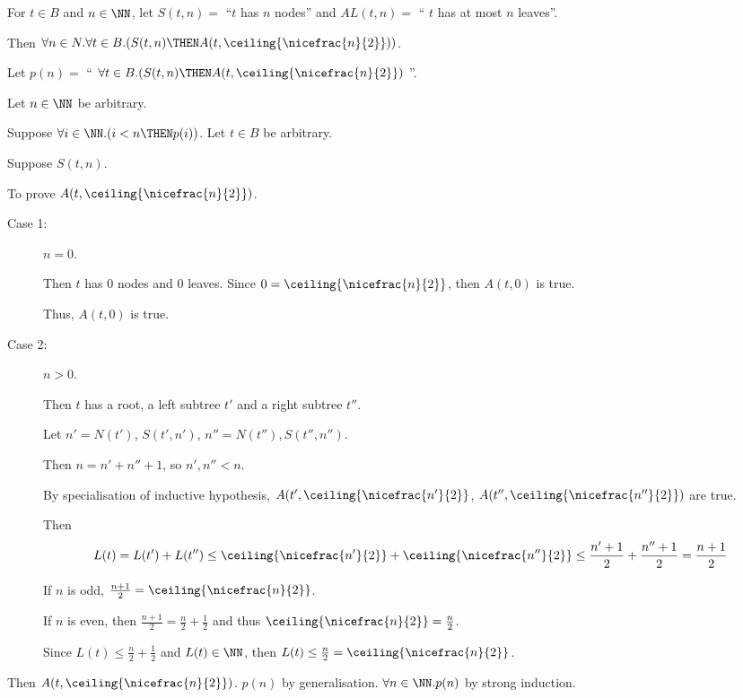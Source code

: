 \documentclass[11pt]{scrartcl}
\begin{document}
\begin{example}

  For $t\in B$ and $n\in \NN$, let $S(t,n) =$ ``$t$ has $n$ nodes'' and $AL(t, n)=$ `` $t$ has at most $n$ leaves''.

  Then $\forall n\in N.\forall t\in B.(S(t, n) \THEN A(t, \ceiling{\nicefrac{n}{2}}))$.

  Let $p(n) = $ `` $\forall t\in B.(S(t, n) \THEN A(t,\ceiling{\nicefrac{n}{2}})$ ''.

  Let $n\in\NN$ be arbitrary.

  Suppose $\forall i\in\NN.(i < n \THEN p(i))$.
  Let $t\in B$   be arbitrary.

  Suppose $S(t, n)$.

  To prove $A(t, \ceiling{\nicefrac{n}{2}})$.

  \begin{description}

  \item[Case 1:]
    \hfill
    
    $n=0$.

    Then $t$ has 0 nodes and 0 leaves. Since $0 = \ceiling{\nicefrac{n}{2}}$, then $A(t, 0)$ is true.

    Thus, $A(t, 0)$ is true.
  \item[Case 2:]
    \hfill
    
    $n>0$.

    Then $t$ has a root, a left subtree $t'$ and a right subtree $t''$.

    Let $n' = N(t')$, $S(t',n')$, $n''=N(t''), S(t'', n'')$.

    Then $n=n' + n'' + 1$, so $n', n'' < n$.

    By specialisation of inductive hypothesis,
    $A(t', \ceiling{\nicefrac{n'}{2}}$, $A(t'', \ceiling{\nicefrac{n''}{2}})$ are true.

    Then
    \[
      L(t) = L(t') +L(t'') \leq \ceiling{\nicefrac{n'}{2}} + \ceiling{\nicefrac{n''}{2}} \leq \frac{n' + 1}{2} + \frac{n''+1}{2} = \frac{n+1}{2}
    \]

    If $n$ is odd, $\frac{n+1}{2} = \ceiling{\nicefrac{n}{2}}$.

    If $n$ is even, then $\frac{n+1}{2} = \frac{n}{2}+ \frac{1}{2}$ and thus $\ceiling{\nicefrac{n}{2}} = \frac{n}{2}$.

    Since $L(t) \leq \frac{n}{2} +\frac{1}{2}$ and $L(t) \in \NN$, then $L(t) \leq \frac{n}{2} =\ceiling{\nicefrac{n}{2}}$.

  \end{description}

  Then $A(t, \ceiling{\nicefrac{n}{2}})$.
  $p(n)$ by generalisation.
  $\forall n\in \NN.p(n)$ by strong induction.

  
  

\end{example}
\end{document}
